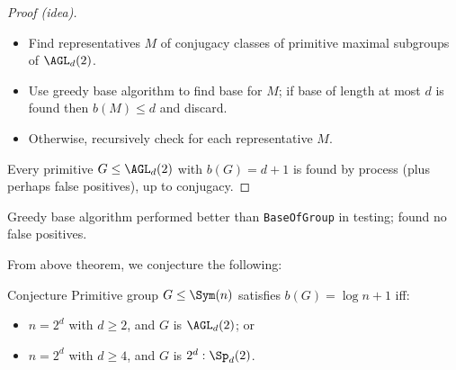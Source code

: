 \begin{slide}
    \begin{proof}[Proof (idea)]
        \begin{itemize}
            \item Find representatives $M$ of conjugacy classes of primitive maximal subgroups of $\AGL_d(2)$. \pause
            \item Use greedy base algorithm to find base for $M$; if base of length at most $d$ is found then $b(M) \leq d$ and discard. \pause
            \item Otherwise, recursively check for each representative $M$.
        \end{itemize} \pause

        Every primitive $G \leq \AGL_d(2)$ with $b(G) = d + 1$ is found by process (plus perhaps false positives), up to conjugacy.
    \end{proof}

    Greedy base algorithm performed better than \texttt{BaseOfGroup} in testing; found no false positives.
\end{slide}

\begin{slide}
    From above theorem, we conjecture the following:

    \begin{alertblock}{Conjecture}
        \vspace{0pt}
        Primitive group $G \leq \Sym(n)$ satisfies $b(G) = \log n + 1$ iff: \pause
        \begin{itemize}
            \item $n = 2^d$ with $d \geq 2$, and $G$ is $\AGL_d(2)$; or
            \item $n = 2^d$ with $d \geq 4$, and $G$ is $2^d : \Sp_d(2)$.
        \end{itemize}
    \end{alertblock}
\end{slide}